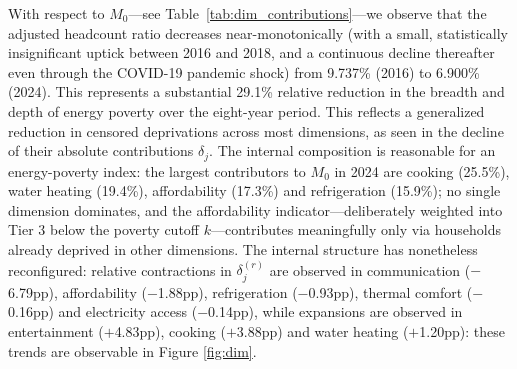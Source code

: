 \documentclass[11pt, a4paper]{article}
\begin{document}
With respect to $M_0$---see Table~\ref{tab:dim_contributions}---we observe that the adjusted headcount ratio decreases near-monotonically (with a small, statistically insignificant uptick between 2016 and 2018, and a continuous decline thereafter even through the COVID-19 pandemic shock) from 9.737\% (2016) to 6.900\% (2024). This represents a substantial 29.1\% relative reduction in the breadth and depth of energy poverty over the eight-year period. This reflects a generalized reduction in censored deprivations across most dimensions, as seen in the decline of their absolute contributions $\delta_j$. The internal composition is reasonable for an energy-poverty index: the largest contributors to $M_0$ in 2024 are cooking (25.5\%), water heating (19.4\%), affordability (17.3\%) and refrigeration (15.9\%); no single dimension dominates, and the affordability indicator---deliberately weighted into Tier 3 below the poverty cutoff $k$---contributes meaningfully only via households already deprived in other dimensions. The internal structure has nonetheless reconfigured: relative contractions in $\delta_j^{(r)}$ are observed in communication ($-$6.79pp), affordability ($-$1.88pp), refrigeration ($-$0.93pp), thermal comfort ($-$0.16pp) and electricity access ($-$0.14pp), while expansions are observed in entertainment ($+$4.83pp), cooking ($+$3.88pp) and water heating ($+$1.20pp): these trends are observable in Figure \ref{fig:dim}.
\end{document}
